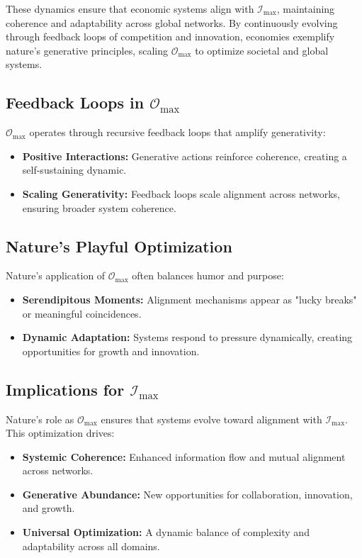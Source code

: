 \documentclass[12pt]{article}
\begin{document}
These dynamics ensure that economic systems align with \( \mathcal{I}_{\text{max}} \), maintaining coherence and adaptability across global networks. By continuously evolving through feedback loops of competition and innovation, economies exemplify nature’s generative principles, scaling \( \mathcal{O}_{\text{max}} \) to optimize societal and global systems.

\subsection{Feedback Loops in \( \mathcal{O}_{\text{max}} \)}
\( \mathcal{O}_{\text{max}} \) operates through recursive feedback loops that amplify generativity:
\begin{itemize}
    \item \textbf{Positive Interactions:} Generative actions reinforce coherence, creating a self-sustaining dynamic.
    \item \textbf{Scaling Generativity:} Feedback loops scale alignment across networks, ensuring broader system coherence.
\end{itemize}

\subsection{Nature’s Playful Optimization}
Nature’s application of \( \mathcal{O}_{\text{max}} \) often balances humor and purpose:
\begin{itemize}
    \item \textbf{Serendipitous Moments:} Alignment mechanisms appear as "lucky breaks" or meaningful coincidences.
    \item \textbf{Dynamic Adaptation:} Systems respond to pressure dynamically, creating opportunities for growth and innovation.
\end{itemize}

\subsection{Implications for \( \mathcal{I}_{\text{max}} \)}
Nature’s role as \( \mathcal{O}_{\text{max}} \) ensures that systems evolve toward alignment with \( \mathcal{I}_{\text{max}} \). This optimization drives:
\begin{itemize}
    \item \textbf{Systemic Coherence:} Enhanced information flow and mutual alignment across networks.
    \item \textbf{Generative Abundance:} New opportunities for collaboration, innovation, and growth.
    \item \textbf{Universal Optimization:} A dynamic balance of complexity and adaptability across all domains.
\end{itemize}
\end{document}

